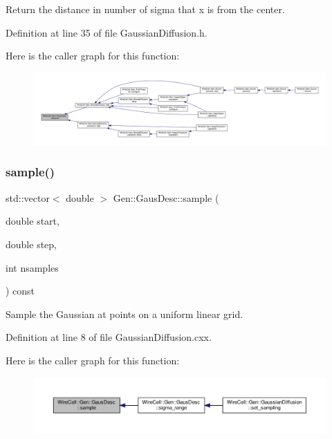 Return the distance in number of sigma that x is from the center. 



Definition at line 35 of file Gaussian\+Diffusion.\+h.

Here is the caller graph for this function\+:
\nopagebreak
\begin{figure}[H]
\begin{center}
\leavevmode
\includegraphics[width=350pt]{struct_wire_cell_1_1_gen_1_1_gaus_desc_a769c9958842435a1dba72113be6d8f09_icgraph}
\end{center}
\end{figure}
\mbox{\label{struct_wire_cell_1_1_gen_1_1_gaus_desc_a0d636bf5b689646d52f07cac3432824e}} 
\subsubsection{\texorpdfstring{sample()}{sample()}}
{\footnotesize\ttfamily std\+::vector$<$ double $>$ Gen\+::\+Gaus\+Desc\+::sample (\begin{DoxyParamCaption}\item[{double}]{start,  }\item[{double}]{step,  }\item[{int}]{nsamples }\end{DoxyParamCaption}) const}

Sample the Gaussian at points on a uniform linear grid. 

Definition at line 8 of file Gaussian\+Diffusion.\+cxx.

Here is the caller graph for this function\+:
\nopagebreak
\begin{figure}[H]
\begin{center}
\leavevmode
\includegraphics[width=350pt]{struct_wire_cell_1_1_gen_1_1_gaus_desc_a0d636bf5b689646d52f07cac3432824e_icgraph}
\end{center}
\end{figure}
\mbox{\label{struct_wire_cell_1_1_gen_1_1_gaus_desc_a5340bfa4adeaccdcac2766ecd1b4a3b0}} 
